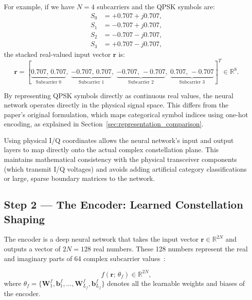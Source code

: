 For example, if we have $N = 4$ subcarriers and the QPSK symbols are:
\begin{align*}
    S_0 & = +0.707 + j0.707, \\
    S_1 & = -0.707 + j0.707, \\
    S_2 & = -0.707 - j0.707, \\
    S_3 & = +0.707 - j0.707,
\end{align*}
the stacked real-valued input vector $\bm{r}$ is:
\begin{equation*}
    \bm{r} = [\underbrace{0.707,\, 0.707}_{\text{Subcarrier 0}},\;
    \underbrace{-0.707,\, 0.707}_{\text{Subcarrier 1}},\;
    \underbrace{-0.707,\, -0.707}_{\text{Subcarrier 2}},\;
    \underbrace{0.707,\, -0.707}_{\text{Subcarrier 3}}]^T \in \mathbb{R}^8.
\end{equation*}

By representing QPSK symbols directly as continuous real values, the neural network operates directly in the physical signal space. This differs from the paper's original formulation, which maps categorical symbol indices using one-hot encoding, as explained in Section~\ref{sec:representation_comparison}.

\begin{keyinsight}
    Using physical I/Q coordinates allows the neural network's input and output layers to map directly onto the actual complex constellation plane. This maintains mathematical consistency with the physical transceiver components (which transmit I/Q voltages) and avoids adding artificial category classifications or large, sparse boundary matrices to the network.
\end{keyinsight}

\subsection{Step 2 --- The Encoder: Learned Constellation Shaping}

The encoder is a deep neural network that takes the input vector $\bm{r} \in \mathbb{R}^{2N}$ and outputs a vector of $2N = 128$ real numbers.  These 128 numbers represent the real and imaginary parts of 64 complex subcarrier values~\cite{kim2017novel}:

\begin{equation*}
    f(\bm{r};\,\theta_f) \in \mathbb{R}^{2N},
\end{equation*}
where $\theta_f = \{\bm{W}_1^f, \bm{b}_1^f, \dots, \bm{W}_{L_f}^f, \bm{b}_{L_f}^f\}$ denotes all the learnable weights and biases of the encoder.

